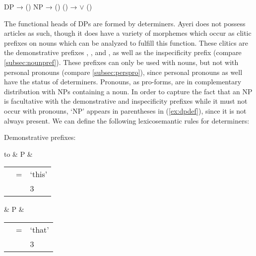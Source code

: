 \pex\label{ex:dpnpstruct}
\a\label{ex:dpdef} DP →  ()
\a\label{ex:npdef} NP →  () ()
\a\label{ex:ndef}  →  
 $\lor$ () 
\xe

The functional heads of DPs are formed by determiners. Ayeri does not possess 
articles as such, though it does have a variety of morphemes which occur 
as clitic prefixes on nouns which can be analyzed to fulfill this function. 
These clitics are the demonstrative prefixes , 
, and , as well as the 
inspecificity prefix  (compare \autoref{subsec:nounpref}). 
These prefixes can only be used with nouns, but not with personal pronouns 
(compare \autoref{subsec:perspro}), since personal pronouns as well have the 
status of determiners. Pronouns, as pro-forms, are in complementary 
distribution with NPs containing a noun. In order to capture the fact that an 
NP is facultative with the demonstrative and inspecificity prefixes while it 
must not occur with pronouns, `NP' appears in parentheses in (\ref{ex:dpdef}), 
since it is not always present. We can define the following lexicosemantic 
rules for determiners:

\pex
\a Demonstrative prefixes:\medskip

	\begin{tabu} to \linewidth {X[15l] X[5l] X[80l]}
		& P
		& \begin{tabular}[t]{l l l}
			\ups{\Pred} & = & `this' \\
			\ups{\Pers} & \req{} & 3 \\
		\end{tabular}
	\end{tabu}\medskip

	\begin{tabu} {}
		& P
		& \begin{tabular}[t]{l l l}
			\ups{\Pred} & = & `that' \\
			\ups{\Pers} & \req{} & 3 \\
		\end{tabular}
	\end{tabu}\medskip
	
